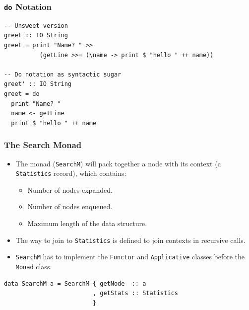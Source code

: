 \documentclass{beamer}
\begin{document}
\begin{frame}[fragile]
  \frametitle{\texttt{do} Notation}
\begin{lstlisting}[style=haskell]
-- Unsweet version
greet :: IO String
greet = print "Name? " >>
          (getLine >>= (\name -> print $ "hello " ++ name))

-- Do notation as syntactic sugar
greet' :: IO String
greet = do
  print "Name? "
  name <- getLine
  print $ "hello " ++ name
\end{lstlisting}
\end{frame}

\begin{frame}[fragile]
  \frametitle{The Search Monad}
  \begin{itemize}
  \item The monad (\texttt{SearchM}) will pack together a node with its context
    (a \texttt{Statistics} record), which contains:
    \begin{itemize}
    \item Number of nodes expanded.
    \item Number of nodes enqueued.
    \item Maximum length of the data structure.
    \end{itemize}
  \item The way to join to \texttt{Statistics} is defined to join contexts in
    recursive calls.
  \item \texttt{SearchM} has to implement the \texttt{Functor} and
    \texttt{Applicative} classes before the \texttt{Monad} class.
  \end{itemize}

  \begin{lstlisting}[style=haskell]
data SearchM a = SearchM { getNode  :: a
                         , getStats :: Statistics
                         }
\end{lstlisting}
\end{frame}
\end{document}
